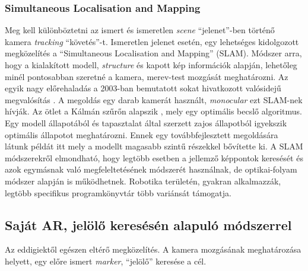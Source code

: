 \documentclass[12pt,a4paper,oneside]{report} %
\begin{document}
\subsubsection{Simultaneous Localisation and Mapping}
Meg kell különböztetni az ismert és ismeretlen \textit{scene} ``jelenet''-ben történő kamera \textit{tracking} ``követés''-t. Ismeretlen jelenet esetén, egy lehetséges kidolgozott megközelítés a ``Simultaneous Localisation and Mapping'' (SLAM). Módszer arra, hogy a kialakított modell, \textit{structure} és kapott kép információk alapján, lehetőleg minél pontosabban szeretné a kamera, merev-test mozgását meghatározni.
Az egyik nagy előrehaladás a 2003-ban bemutatott sokat hivatkozott valósidejű megvalósítás \cite{davison2003real}. A megoldás egy darab kamerát használt, \textit{monocular} ezt SLAM-nek hívják. 
Az ötlet a Kálmán szűrőn alapszik \cite{welch1995introduction}, mely  egy optimális becslő algoritmus. Egy modell állapotából és tapasztalat által szerzett zajos állapotból igyekszik optimális állapotot meghatározni. Ennek egy továbbfejlesztett megoldására látunk példát itt \cite{klein2008improving} mely a modellt magasabb szintű részekkel bővítette ki. A SLAM módszerekről elmondható, hogy legtöbb esetben a jellemző képpontok keresését és azok egymásnak való megfeleltetésének módszerét használnak, de optikai-folyam módszer alapján is működhetnek. 
Robotika területén, gyakran alkalmazzák, legtöbb specifikus programkönyvtár több variánsát támogatja.

\subsection{Saját AR, jelölő keresésén alapuló módszerrel}
Az eddigiektől egészen eltérő megközelítés. A kamera mozgásának meghatározása helyett, egy előre ismert \textit{marker}, ``jelölő''  keresése a cél. 
\end{document}
